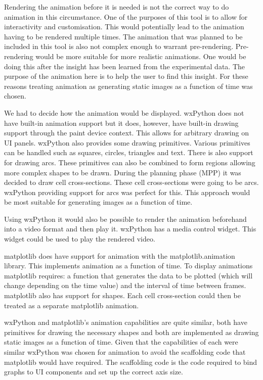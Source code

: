 
Rendering the animation before it is needed is not the correct way to do animation in this circumstance.  One of the purposes of this tool is to allow for interactivity and customisation.  This would potentially lead to the animation having to be rendered multiple times.  The animation that was planned to be included in this tool is also not complex enough to warrant pre-rendering.  Pre-rendering would be more suitable for more realistic animations.  One would be doing this after the insight has been learned from the experimental data.  The purpose of the animation here is to help the user to find this insight.  For these reasons treating animation as generating static images as a function of time was chosen.

We had to decide how the animation would be displayed. wxPython does not have built-in animation support but it does, however, have built-in drawing support through the paint device context.  This allows for arbitrary drawing on \ac{UI} panels.  wxPython also provides some drawing primitives.  Various primitives can be handled such as squares, circles, triangles and text.  There is also support for drawing arcs.  These primitives can also be combined to form regions allowing more complex shapes to be drawn.  During the planning phase (MPP) it was decided to draw cell cross-sections.  These cell cross-sections were going to be arcs.  wxPython providing support for arcs was perfect for this.  This approach would be most suitable for generating images as a function of time.

Using wxPython it would also be possible to render the animation beforehand into a video format and then play it.  wxPython has a media control widget.  This widget could be used to play the rendered video.

matplotlib does have support for animation with the matplotlib.animation library.  This implements animation as a function of time.  To display animations matplotlib requires: a function that generates the data to be plotted (which will change depending on the time value) and the interval of time between frames.  matplotlib also has support for shapes.  Each cell cross-section could then be treated as a separate matplotlib animation.

wxPython and matplotlib's animation capabilities are quite similar, both have primitives for drawing the necessary shapes and both are implemented as drawing static images as a function of time.  Given that the capabilities of each were similar wxPython was chosen for animation to avoid the scaffolding code that matplotlib would have required.  The scaffolding code is the code required to bind graphs to \ac{UI} components and set up the correct axis size.

